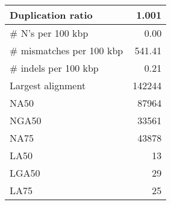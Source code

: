 \documentclass[12pt,a4paper]{article}
\begin{document}
\begin{table}[ht]
\begin{center}
\begin{tabular}{|l*{1}{|r}|}
Duplication ratio & 1.001 \\ \hline
\# N's per 100 kbp & 0.00 \\ \hline
\# mismatches per 100 kbp & 541.41 \\ \hline
\# indels per 100 kbp & 0.21 \\ \hline
Largest alignment & 142244 \\ \hline
NA50 & 87964 \\ \hline
NGA50 & 33561 \\ \hline
NA75 & 43878 \\ \hline
LA50 & 13 \\ \hline
LGA50 & 29 \\ \hline
LA75 & 25 \\ \hline
\end{tabular}
\end{center}
\end{table}
\end{document}

